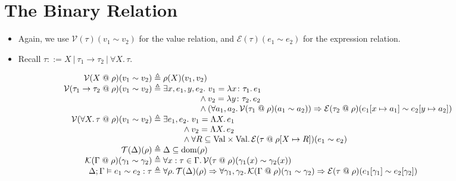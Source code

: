 \documentclass{lecturenotes}
\makeatletter
\newcommand{\tabs}[3]{\ensuremath{\lambda #1 \colon #2.\,#3}}
\newcommand{\fatype}[2]{\ensuremath{\forall #1.\,#2}}
\newcommand{\Abs}[2]{\Lambda #1.\,#2}
\newcommand{\at}{\ensuremath{\mathrel{@}}}
\newcommand{\binval}[4]{\ensuremath{\mathcal{V}(#1 \at #2)(#3 \sim #4)}}
\newcommand{\binexpr}[4]{\ensuremath{\mathcal{E}(#1 \at #2)(#3 \sim #4)}}
\newcommand{\bintypectxt}[2]{\ensuremath{\mathcal{T}(#1)(#2)}}
\newcommand{\binctxt}[4]{\ensuremath{\mathcal{K}(#1 \at #2)(#3 \sim #4)}}
\makeatother
\begin{document}
\section{The Binary Relation}\label{sec:the-binary-relation}
\begin{itemize}
    \item Again, we use $\mathcal{V}(\tau)(v_1 \sim v_2)$ for the value relation, and $\mathcal{E}(\tau)(e_1 \sim e_2)$ for the expression relation.
    \item Recall $\tau ::= X\ \vert\ \tau_1 \to \tau_2\ \vert\ \fatype{X}{\tau}$.
\end{itemize}

\[
\begin{array}{r@{\;\triangleq\;}l}
    \binval{X}{\rho}{v_1}{v_2} & \rho(X)(v_1, v_2)\\
    \binval{\tau_1 \to \tau_2}{\rho}{v_1}{v_2} &
        \exists x, e_1, y, e_2.\, \hspace{-1.5em}\begin{array}[t]{l}\hspace{1.15em}v_1 = \tabs{x}{\tau_1}{e_1}\\{} \land v_2 = \tabs{y}{\tau_2}{e_2}\\{} \land (\forall a_1, a_2.\, \binval{\tau_1}{\rho}{a_1}{a_2}) \Rightarrow \binexpr{\tau_2}{\rho}{e_1[x \mapsto a_1]}{e_2[y \mapsto a_2]}\end{array}\\
    \binval{\fatype{X}{\tau}}{\rho}{v_1}{v_2} &
        \exists e_1, e_2.\, \hspace{-1.5em}\begin{array}[t]{l}\hspace{1.15em}v_1 = \Abs{X}{e_1}\\{} \land v_2 = \Abs{X}{e_2}\\ {} \land \forall R \subseteq \text{Val} \times \text{Val}.\, \binexpr{\tau}{\rho[X \mapsto R]}{e_1}{e_2}\end{array}\\

    \bintypectxt{\Delta}{\rho} & \Delta \subseteq \text{dom}(\rho) \\
    \binctxt{\Gamma}{\rho}{\gamma_1}{\gamma_2} & \forall x : \tau \in \Gamma.\, \binval{\tau}{\rho}{\gamma_1(x)}{\gamma_2(x)} \\
    \Delta; \Gamma \vDash e_1 \sim e_2 : \tau & \forall \rho.\, \bintypectxt{\Delta}{\rho} \Rightarrow \forall \gamma_1, \gamma_2.\, \binctxt{\Gamma}{\rho}{\gamma_1}{\gamma_2} \Rightarrow \binexpr{\tau}{\rho}{e_1[\gamma_1]}{e_2[\gamma_2]}    
\end{array}
\]
\end{document}

